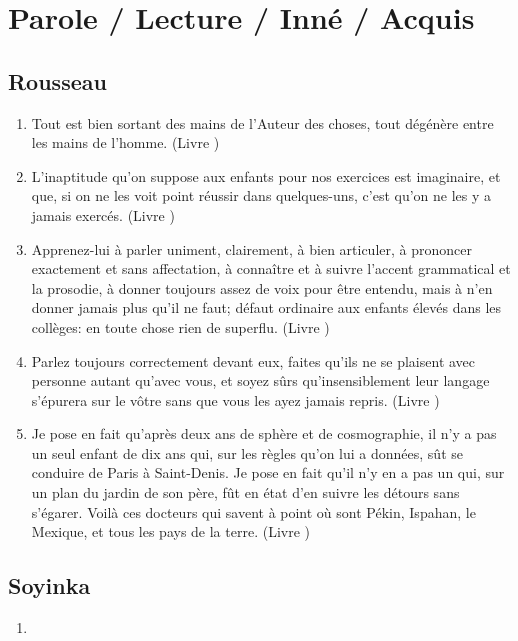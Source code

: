 \documentclass[a4paper, 11pt, hidelinks]{article}
\newcommand{\rb}[1]{\Romanbar{#1}}
\begin{document}
\section{Parole / Lecture / Inné / Acquis}



\subsection{Rousseau}


\begin{enumerate}
    \item Tout est bien sortant des mains de l'Auteur des choses, tout dégénère entre les mains de l'homme. (Livre \rb{1})
    \item L'inaptitude qu'on suppose aux enfants pour nos exercices est imaginaire, et que, si on ne les voit point réussir dans quelques-uns, c'est qu'on ne les y a jamais exercés. (Livre \rb{2})
    \item Apprenez-lui à parler uniment, clairement, à bien articuler, à prononcer exactement et sans affectation, à connaître et à suivre l'accent grammatical et la prosodie, à donner toujours assez de voix pour être entendu, mais à n'en donner jamais plus qu'il ne faut; défaut ordinaire aux enfants élevés dans les collèges: en toute chose rien de superflu. (Livre \rb{2})
    \item Parlez toujours correctement devant eux, faites qu'ils ne se plaisent avec personne autant qu'avec vous, et soyez sûrs qu'insensiblement leur langage s'épurera sur le vôtre sans que vous les ayez jamais repris. (Livre \rb{1})
    \item Je pose en fait qu'après deux ans de sphère et de cosmographie, il n'y a pas un seul enfant de dix ans qui, sur les règles qu'on lui a données, sût se conduire de Paris à Saint-Denis. Je pose en fait qu'il n'y en a pas un qui, sur un plan du jardin de son père, fût en état d'en suivre les détours sans s'égarer. Voilà ces docteurs qui savent à point où sont Pékin, Ispahan, le Mexique, et tous les pays de la terre. (Livre \rb{2})
\end{enumerate}



\subsection{Soyinka}


\begin{enumerate}
    \item 
\end{enumerate}
\end{document}

